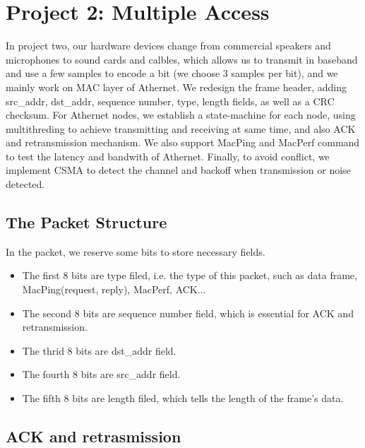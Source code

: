 \documentclass[11pt, conference]{IEEEtran}
\begin{document}
\section{Project 2: Multiple Access}

In project two, our hardware devices change from commercial speakers and microphones to sound cards and calbles, which allows us to transmit in baseband and use a few samples to 
encode a bit (we choose 3 samples per bit), and we mainly work on MAC layer of Athernet. We redesign the frame header, adding src\_addr, dst\_addr, sequence number, type, length fields,
as well as a CRC checksum. For Athernet nodes, we establish a state-machine for each node, using multithreding to achieve transmitting and receiving at same time, and also ACK and retransmission
mechanism. We also support MacPing and MacPerf command to test the latency and bandwith of Athernet. Finally, to avoid conflict, we implement CSMA to detect the channel and backoff when transmission or noise detected.

\subsection{The Packet Structure}

In the packet, we reserve some bits to store necessary fields.
\begin{itemize}
\item The first 8 bits are type filed, i.e. the type of this packet, such as data frame, MacPing(request, reply), MacPerf, ACK...
\item The second 8 bits are sequence number field, which is essential for ACK and retransmission.
\item The thrid 8 bits are dst\_addr field. 
\item The fourth 8 bits are src\_addr field.
\item The fifth 8 bits are length filed, which tells the length of the frame's data.
\end{itemize}

\subsection{ACK and retrasmission}
\end{document}
